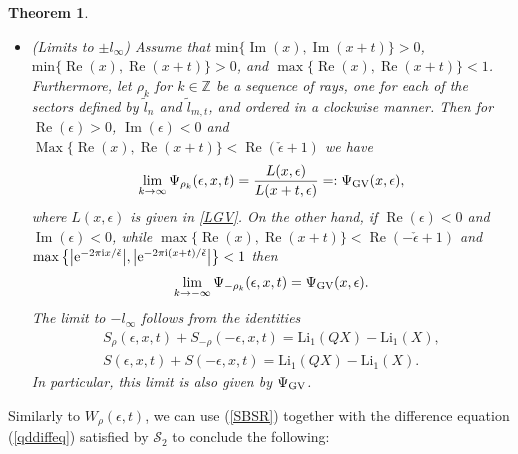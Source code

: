 \documentclass[pdftex]{sigma}
\numberwithin{equation}{section}
\newtheorem{Theorem}{Theorem}[section]
\begin{document}
\begin{Theorem}
\begin{itemize}
\item {\rm (Limits to $\pm l_{\infty}$)} Assume that $\text{min}\{\operatorname{Im}(x),\operatorname{Im}(x+t)\}>0$, $\text{min}\{\operatorname{Re}(x),\operatorname{Re}(x+t)\}>0$, and $\max \{\operatorname{Re}(x),\operatorname{Re}(x+t)\}<1$. Furthermore, let $\rho_k$ for $k\in \mathbb{Z}$ be a sequence of rays, one for each of the sectors defined by $\widetilde{l}_n$ and $\widetilde{l}_{m,t}$, and ordered in a clockwise manner. Then for $\operatorname{Re}(\epsilon)>0$, $\operatorname{Im}(\epsilon)<0$ and $\operatorname{Max}\{\operatorname{Re}(x),\operatorname{Re}(x+t)\}<\operatorname{Re}(\check\epsilon+1)$ we have
\begin{equation}\label{Psilinfty}
\lim_{k\to \infty}\Psi_{\rho_k}(\epsilon,x,t)=\frac{L(x,\epsilon)}{L(x+t,\epsilon)}=:\Psi_{{\rm GV}}(x,\epsilon),
\end{equation}
where $L(x,\epsilon)$ is given in \eqref{LGV}.
On the other hand, if $\operatorname{Re}(\epsilon)<0$ and $\operatorname{Im}(\epsilon)<0$, while $\max \{\operatorname{Re}(x),\operatorname{Re}(x+t)\} < \operatorname{Re} (-\check{\epsilon}+1)$ and $\max \big\{\big|{\rm e}^{-2\pi \mathrm ix/\check{\epsilon}}\big|,\big|{\rm e}^{-2\pi \mathrm i(x+t)/\check{\epsilon}}\big|\big\}<1$ then
\begin{equation*}%
\lim_{k\to -\infty}\Psi_{-\rho_k}(\epsilon,x,t)=\Psi_{{\rm GV}}(x,\epsilon).
\end{equation*}
The limit to $-l_{\infty}$ follows from the identities
\begin{gather*}
 S_{\rho}(\epsilon,x,t)+S_{-\rho}(-\epsilon,x,t)=\mathrm{Li}_1(QX)-\mathrm{Li}_1(X),\\
 S(\epsilon,x,t)+S(-\epsilon,x,t)=\mathrm{Li}_1(QX)-\mathrm{Li}_1(X).
\end{gather*}
In particular, this limit is also given by $\Psi_{{\rm GV}}$.
\end{itemize}
\end{Theorem}

Similarly to $W_{\rho}(\epsilon,t)$, we can use (\ref{SBSR}) together with the difference equation (\ref{qddiffeq}) satisfied by $\mathcal{S}_2$ to conclude the following:
\end{document}
